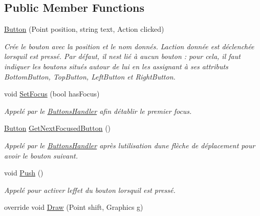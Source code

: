 \subsection*{Public Member Functions}
\begin{DoxyCompactItemize}
\item 
\hyperlink{class_tentacle_slicers_1_1hud_1_1_button_a41aa3f0c68bde25671963d2ddce9b66e}{Button} (Point position, string text, Action clicked)
\begin{DoxyCompactList}\small\item\em Crée le bouton avec la position et le nom donnés. L\textquotesingle{}action donnée est déclenchée lorsqu\textquotesingle{}il est pressé. Par défaut, il n\textquotesingle{}est lié à aucun bouton \+: pour cela, il faut indiquer les boutons situés autour de lui en les assignant à ses attributs Bottom\+Button, Top\+Button, Left\+Button et Right\+Button. \end{DoxyCompactList}\item 
void \hyperlink{class_tentacle_slicers_1_1hud_1_1_button_ae9a492344e8206e714c49e4d972401cc}{Set\+Focus} (bool has\+Focus)
\begin{DoxyCompactList}\small\item\em Appelé par le \hyperlink{class_tentacle_slicers_1_1hud_1_1_buttons_handler}{Buttons\+Handler} afin d\textquotesingle{}établir le premier focus. \end{DoxyCompactList}\item 
\hyperlink{class_tentacle_slicers_1_1hud_1_1_button}{Button} \hyperlink{class_tentacle_slicers_1_1hud_1_1_button_a5f7c33e7dee80c333c1d3db7ff717ab4}{Get\+Next\+Focused\+Button} ()
\begin{DoxyCompactList}\small\item\em Appelé par le \hyperlink{class_tentacle_slicers_1_1hud_1_1_buttons_handler}{Buttons\+Handler} après l\textquotesingle{}utilisation d\textquotesingle{}une flèche de déplacement pour avoir le bouton suivant. \end{DoxyCompactList}\item 
void \hyperlink{class_tentacle_slicers_1_1hud_1_1_button_a8558c5d12e84c184c252c26d77520b0e}{Push} ()
\begin{DoxyCompactList}\small\item\em Appelé pour activer l\textquotesingle{}effet du bouton lorsqu\textquotesingle{}il est pressé. \end{DoxyCompactList}\item 
override void \hyperlink{class_tentacle_slicers_1_1hud_1_1_button_a56c59149f165a05312d75cf1e1fea3fd}{Draw} (Point shift, Graphics g)

\end{DoxyCompactItemize}
